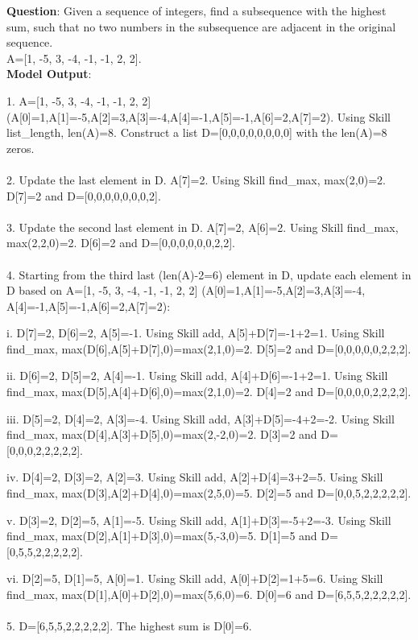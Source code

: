 \documentclass{article} \usepackage{arxiv}
\begin{document}
\begin{tcolorbox}[title = {DP}, colback = Apricot!25!white, colframe = BrickRed!75!black] 
\textbf{Question}:  Given a sequence of integers, find a subsequence with the highest sum, such that no two numbers in the subsequence are adjacent in the original sequence.  \\ 
A=[1, -5, 3, -4, -1, -1, 2, 2]. \\


\tcblower
\textbf{Model Output}:

\quad

1. A=[1, -5, 3, -4, -1, -1, 2, 2] (A[0]=1,A[1]=-5,A[2]=3,A[3]=-4,A[4]=-1,A[5]=-1,A[6]=2,A[7]=2). Using Skill list\_length, len(A)=8. Construct a list D=[0,0,0,0,0,0,0,0] with the len(A)=8 zeros. \\ \\
2. Update the last element in D. A[7]=2. Using Skill find\_max, max(2,0)=2. D[7]=2 and D=[0,0,0,0,0,0,0,2].  \\ \\
3. Update the second last element in D. A[7]=2, A[6]=2. Using Skill find\_max,  max(2,2,0)=2. D[6]=2 and D=[0,0,0,0,0,0,2,2]. \\ \\
4. Starting from the third last (len(A)-2=6) element in D, update each element in D based on A=[1, -5, 3, -4, -1, -1, 2, 2] (A[0]=1,A[1]=-5,A[2]=3,A[3]=-4, A[4]=-1,A[5]=-1,A[6]=2,A[7]=2): 

\quad

 \qquad i. D[7]=2, D[6]=2, A[5]=-1.  Using Skill add, A[5]+D[7]=-1+2=1. Using Skill find\_max, max(D[6],A[5]+D[7],0)=max(2,1,0)=2. D[5]=2 and  D=[0,0,0,0,0,2,2,2]. 
 
   \qquad  ii. D[6]=2, D[5]=2, A[4]=-1.  Using Skill add, A[4]+D[6]=-1+2=1.  Using Skill find\_max, max(D[5],A[4]+D[6],0)=max(2,1,0)=2. D[4]=2 and  D=[0,0,0,0,2,2,2,2]. 
   
   \qquad  iii. D[5]=2, D[4]=2, A[3]=-4.  Using Skill add, A[3]+D[5]=-4+2=-2. Using Skill find\_max, max(D[4],A[3]+D[5],0)=max(2,-2,0)=2. D[3]=2 and  D=[0,0,0,2,2,2,2,2]. 
   
   \qquad  iv. D[4]=2, D[3]=2, A[2]=3.  Using Skill add, A[2]+D[4]=3+2=5.  Using Skill find\_max, max(D[3],A[2]+D[4],0)=max(2,5,0)=5. D[2]=5 and  D=[0,0,5,2,2,2,2,2]. 
   
   \qquad  v. D[3]=2, D[2]=5, A[1]=-5.  Using Skill add, A[1]+D[3]=-5+2=-3.  Using Skill find\_max, max(D[2],A[1]+D[3],0)=max(5,-3,0)=5. D[1]=5 and  D=[0,5,5,2,2,2,2,2]. 
   
   \qquad  vi. D[2]=5, D[1]=5, A[0]=1.  Using Skill add, A[0]+D[2]=1+5=6.  Using Skill find\_max, max(D[1],A[0]+D[2],0)=max(5,6,0)=6. D[0]=6 and  D=[6,5,5,2,2,2,2,2]. \\ \\
5. D=[6,5,5,2,2,2,2,2]. The highest sum is D[0]=6. 
\end{tcolorbox}
\noindent\begin{minipage}{\textwidth}
 \label{Tab:example_compose_dp_skill}
\end{minipage}
\end{document}
